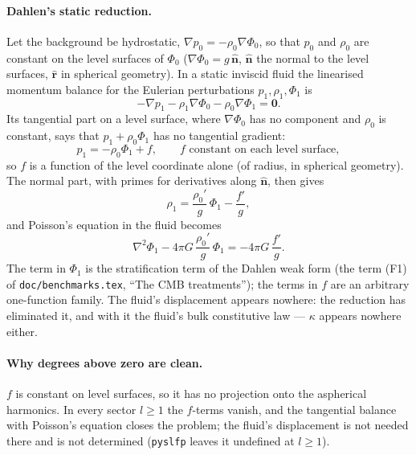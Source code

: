 \documentclass[11pt]{article}
\numberwithin{equation}{section}
\newcommand{\vn}{\hat{\mathbf{n}}}
\newcommand{\rhat}{\hat{\mathbf{r}}}
\newcommand{\code}[1]{\texttt{#1}}
\begin{document}
\paragraph{Dahlen's static reduction.} Let the background be hydrostatic,
$\nabla p_0 = -\rho_0\nabla\Phi_0$, so that $p_0$ and $\rho_0$ are constant
on the level surfaces of $\Phi_0$ ($\nabla\Phi_0 = g\,\vn$, $\vn$ the normal
to the level surfaces, $\rhat$ in spherical geometry). In a static inviscid
fluid the linearised momentum balance for the Eulerian perturbations
$p_1,\rho_1,\Phi_1$ is
\begin{equation}
  -\nabla p_1 - \rho_1\nabla\Phi_0 - \rho_0\nabla\Phi_1 = \mathbf 0 .
  \label{eq:fluid-balance}
\end{equation}
Its tangential part on a level surface, where $\nabla\Phi_0$ has no
component and $\rho_0$ is constant, says that $p_1+\rho_0\Phi_1$ has no
tangential gradient:
\begin{equation}
  p_1 = -\rho_0\Phi_1 + f, \qquad f \text{ constant on each level surface},
  \label{eq:dahlen-p}
\end{equation}
so $f$ is a function of the level coordinate alone (of radius, in
spherical geometry). The normal part, with primes for derivatives along
$\vn$, then gives
\begin{equation}
  \rho_1 = \frac{\rho_0'}{g}\,\Phi_1 - \frac{f'}{g},
  \label{eq:dahlen-rho}
\end{equation}
and Poisson's equation in the fluid becomes
\begin{equation}
  \nabla^2\Phi_1 - 4\pi G\,\frac{\rho_0'}{g}\,\Phi_1 = -4\pi G\,\frac{f'}{g}.
  \label{eq:dahlen-poisson}
\end{equation}
The term in $\Phi_1$ is the stratification term of the Dahlen weak form
(the term (F1) of \code{doc/benchmarks.tex}, ``The CMB treatments''); the
terms in $f$ are an arbitrary one-function family. The fluid's displacement
appears nowhere: the reduction has eliminated it, and with it the fluid's
bulk constitutive law --- $\kappa$ appears nowhere either.

\paragraph{Why degrees above zero are clean.} $f$ is constant on level
surfaces, so it has no projection onto the aspherical harmonics. In every
sector $l\ge1$ the $f$-terms vanish, and the tangential balance with
Poisson's equation closes the problem; the fluid's displacement is not
needed there and is not determined (\code{pyslfp} leaves it undefined at
$l\ge1$).
\end{document}
